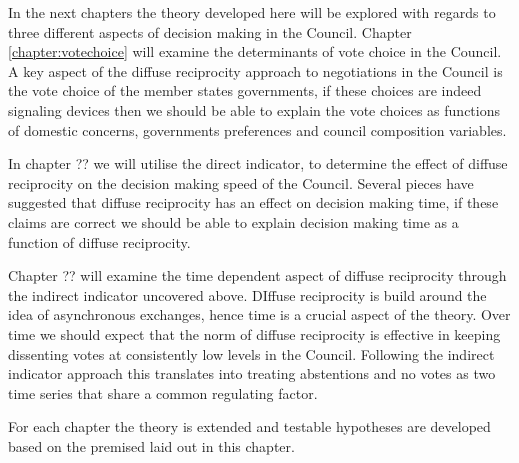In the next chapters the theory developed here will be explored with regards to three different aspects of decision making in the Council. Chapter \ref{chapter:votechoice} will examine the determinants of vote choice in the Council. A key aspect of the diffuse reciprocity approach to negotiations in the Council is the vote choice of the member states governments, if these choices are indeed signaling devices then we should be able to explain the vote choices as functions of domestic concerns, governments preferences and council composition variables.

In chapter ?? we will utilise the direct indicator, to determine the effect of diffuse reciprocity on the decision making speed of the Council. Several pieces have suggested that diffuse reciprocity has an effect on decision making time, if these claims are correct we should be able to explain decision making time as a function of diffuse reciprocity.

Chapter ?? will examine the time dependent aspect of diffuse reciprocity through the indirect indicator uncovered above. DIffuse reciprocity is build around the idea of asynchronous exchanges, hence time is a crucial aspect of the theory. Over time we should expect that the norm of diffuse reciprocity is effective in keeping dissenting votes at consistently low levels in the Council. Following the indirect indicator approach this translates into treating abstentions and no votes as two time series that share a common regulating factor. 

For each chapter the theory is extended and testable hypotheses are developed based on the premised laid out in this chapter. 

